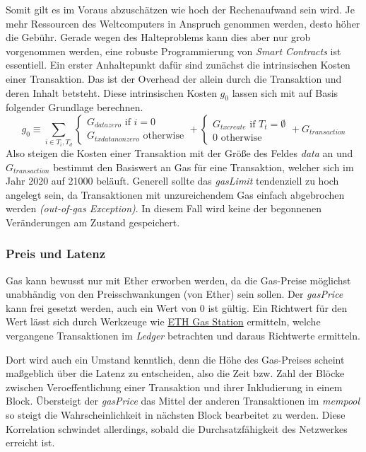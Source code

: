 \documentclass[runningheads]{llncs}
\begin{document}
Somit gilt es im Voraus abzuschätzen wie hoch der Rechenaufwand sein wird. Je mehr Ressourcen des Weltcomputers in Anspruch genommen werden, desto höher die Gebühr. Gerade wegen des Halteproblems kann dies aber nur grob vorgenommen werden, eine robuste Programmierung von \textit{Smart Contracts} ist essentiell. Ein erster Anhaltepunkt dafür sind zunächst die intrinsischen Kosten einer Transaktion. Das ist der Overhead der allein durch die Transaktion und deren Inhalt betsteht. Diese intrinsischen Kosten $ g_0 $ lassen sich mit auf Basis folgender Grundlage berechnen.
$$ g_0 \equiv \sum_{i \in T_i, T_d}
  \begin{cases}
    G_{datazero} \text{ if } i=0 \\
    G_{txdatanonzero} \text{ otherwise}
  \end{cases}
  +
  \begin{cases}
    G_{txcreate} \text{ if } T_t = \emptyset \\
    0 \text{ otherwise}
  \end{cases}
  +
  G_{transaction}
$$
Also steigen die Kosten einer Transaktion mit der Größe des Feldes \textit{data} an und $ G_{transaction} $ bestimmt den Basiswert an Gas für eine Transaktion, welcher sich im Jahr 2020 auf 21000 beläuft. Generell sollte das \textit{gasLimit} tendenziell zu hoch angelegt sein, da Transaktionen mit unzureichendem Gas einfach abgebrochen werden \textit{(out-of-gas Exception)}. In diesem Fall wird keine der begonnenen Veränderungen am Zustand gespeichert.

\subsubsection{Preis und Latenz}
Gas kann bewusst nur mit Ether erworben werden, da die Gas-Preise möglichst unabhändig von den Preisschwankungen (von Ether) sein sollen. Der \textit{gasPrice} kann frei gesetzt werden, auch ein Wert von 0 ist gültig. Ein Richtwert für den Wert lässt sich durch Werkzeuge wie \href{https://www.ethgasstation.info/}{ETH Gas Station} ermitteln, welche vergangene Transaktionen im \textit{Ledger} betrachten und daraus Richtwerte ermitteln.

Dort wird auch ein Umstand kenntlich, denn die Höhe des Gas-Preises scheint maßgeblich über die Latenz zu entscheiden, also die Zeit bzw. Zahl der Blöcke zwischen Veroeffentlichung einer Transaktion und ihrer Inkludierung in einem Block. Übersteigt der \textit{gasPrice} das Mittel der anderen Transaktionen im \textit{mempool} so steigt die Wahrscheinlichkeit in nächsten Block bearbeitet zu werden. Diese Korrelation schwindet allerdings, sobald die Durchsatzfähigkeit des Netzwerkes erreicht ist.
\end{document}
